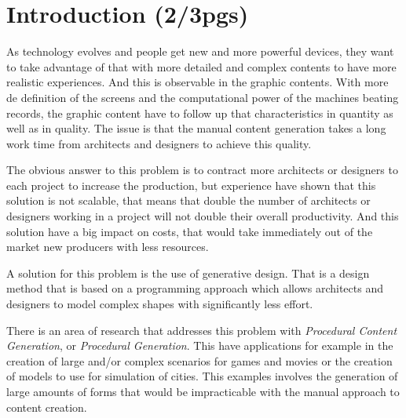 
% 
% 

\section{Introduction (2/3pgs)}
\label{sec:Introduction}


As technology evolves and people get new and more powerful devices, they want to take advantage of that with more detailed and complex contents to have more realistic experiences.
And this is observable in the graphic contents. With more de definition of the screens and the computational power of the machines beating records, the graphic content have to follow up that characteristics in quantity as well as in quality.  The issue is that the manual content generation takes a long work time from architects and designers to achieve this quality. 

The obvious answer to this problem is to contract more architects or designers to each project to increase the production, but experience have shown that this solution is not scalable, that means that double the number of architects or designers working in a project will not double their overall productivity. And this solution have a big impact on costs, that would take immediately out of the market new producers with less resources.

A solution for this problem is the use of generative design. That is a design method that is based on a programming approach which allows architects and designers to model complex shapes with significantly less effort. 


There is an area of research that addresses this problem with \emph{Procedural Content Generation}, or \emph{Procedural Generation}. This have applications for example in the creation of large and/or complex scenarios for games and movies or the creation of models to use for simulation of cities. This examples involves the generation of large amounts of forms that would be impracticable with the manual approach to content creation.





